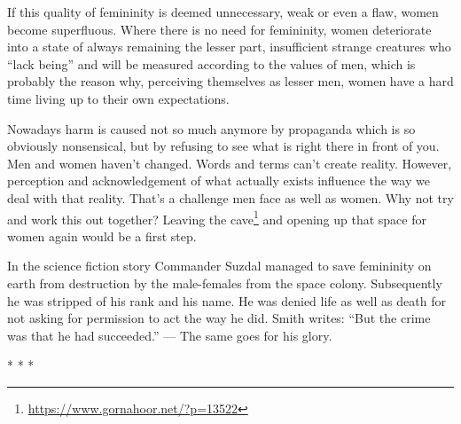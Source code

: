 If this quality of femininity is deemed unnecessary, weak or even a flaw, women become superfluous. Where there is no need for femininity, women deteriorate into a state of always remaining the lesser part, insufficient strange creatures who “lack being” and will be measured according to the values of men, which is probably the reason why, perceiving themselves as lesser men, women have a hard time living up to their own expectations.

Nowadays harm is caused not so much anymore by propaganda which is so obviously nonsensical, but by refusing to see what is right there in front of you. Men and women haven't changed. Words and terms can't create reality. However, perception and acknowledgement of what actually exists influence the way we deal with that reality. That's a challenge men face as well as women. Why not try and work this out together? Leaving the cave\footnote{\url{https://www.gornahoor.net/?p=13522}} and opening up that space for women again would be a first step.

In the science fiction story Commander Suzdal managed to save femininity on earth from destruction by the male-females from the space colony. Subsequently he was stripped of his rank and his name. He was denied life as well as death for not asking for permission to act the way he did. Smith writes: “But the crime was that he had succeeded.” — The same goes for his glory.




\begin{center}* * *\end{center}

